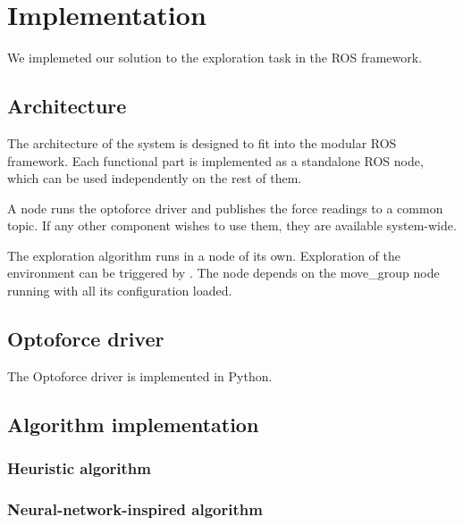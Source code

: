 \documentclass[buriama8_dp.tex]{subfiles}
\begin{document}
\chapter{Implementation}

We implemeted our solution to the exploration task in the ROS framework.

\section{Architecture}
\label{sec:impl_arch}

The architecture of the system is designed to fit into the modular ROS framework. Each functional part is implemented as a standalone ROS node, which can be used independently on the rest of them.

A node runs the optoforce driver and publishes the force readings to a common topic. If any other component wishes to use them, they are available system-wide.

The exploration algorithm runs in a node of its own. Exploration of the environment can be triggered by . The node depends on the move\_group node running with all its configuration loaded.


\section{Optoforce driver}
\label{sec:opto_driver}

The Optoforce driver is implemented in Python. 


\section{Algorithm implementation}
\label{sec:alg_impl}

\subsection{Heuristic algorithm}
\label{subsec:impl_heur}

\subsection{Neural-network-inspired algorithm}
\label{subsec:impl_neuro}
\end{document}
